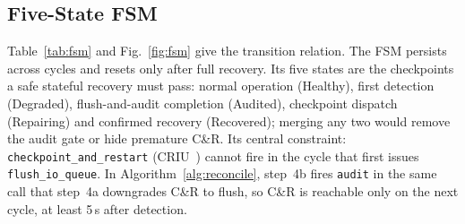 \documentclass[conference]{IEEEtran}
\begin{document}
\subsection{Five-State FSM}

Table~\ref{tab:fsm} and Fig.~\ref{fig:fsm} give the transition relation. The FSM persists across cycles and resets only after full recovery. Its five states are the checkpoints a safe stateful recovery must pass: normal operation (Healthy), first detection (Degraded), flush-and-audit completion (Audited), checkpoint dispatch (Repairing) and confirmed recovery (Recovered); merging any two would remove the audit gate or hide premature C\&R. Its central constraint: \texttt{checkpoint\_and\_restart} (CRIU~\cite{b2}) cannot fire in the cycle that first issues \texttt{flush\_io\_queue}. In Algorithm~\ref{alg:reconcile}, step~4b fires \texttt{audit} in the same call that step~4a downgrades C\&R to flush, so C\&R is reachable only on the next cycle, at least 5\,s after detection.


\begin{table}[!t]
\caption{TYPE F FSM TRANSITION RELATION.}
\label{tab:fsm}
\centering
\renewcommand{\arraystretch}{1.20}
\end{table}
\end{document}
